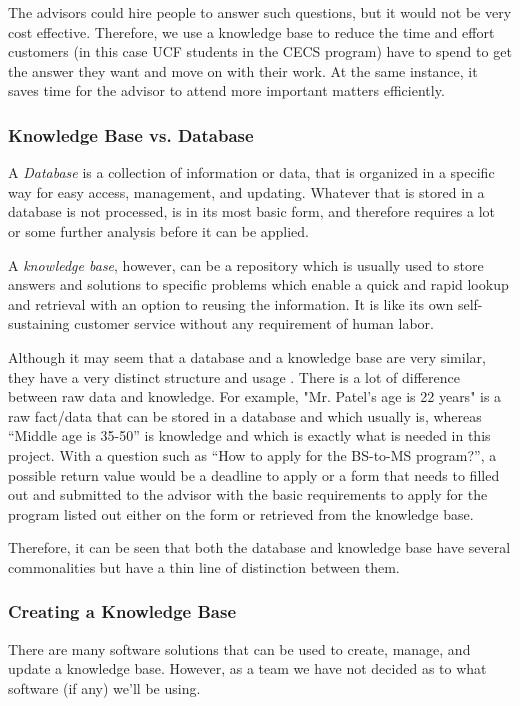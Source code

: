 \documentclass[titlepage, 12pt]{article}
\begin{document}
The advisors could hire people to answer such questions, but it would not be very cost effective. Therefore, we use a knowledge base to reduce the time and effort customers (in this case UCF students in the CECS program) have to spend to get the answer they want and move on with their work. At the same instance, it saves time for the advisor to attend more important matters efficiently.

\subsubsection{Knowledge Base vs. Database}

A \emph{Database} is a collection of information or data, that is organized in a specific way for easy access, management, and updating. Whatever that is stored in a database is not processed, is in its most basic form, and therefore requires a lot or some further analysis before it can be applied.

A \emph{knowledge base}, however, can be a repository which is usually used to store answers and solutions to specific problems which enable a quick and rapid lookup and retrieval with an option to reusing the information. It is like its own self-sustaining customer service without any requirement of human labor.

Although it may seem that a database and a knowledge base are very similar, they have a very distinct structure and usage \cite{bib-2-10}. There is a lot of difference between raw data and knowledge. For example, "Mr. Patel’s age is 22 years" is a raw fact/data that can be stored in a database and which usually is, whereas “Middle age is 35-50” is knowledge and which is exactly what is needed in this project. With a question such as “How to apply for the BS-to-MS program?”, a possible return value would be a deadline to apply or a form that needs to filled out and submitted to the advisor with the basic requirements to apply for the program listed out either on the form or retrieved from the knowledge base.

Therefore, it can be seen that both the database and knowledge base have several commonalities but have a thin line of distinction between them.

\subsubsection{Creating a Knowledge Base}

There are many software solutions that can be used to create, manage, and update a knowledge base. However, as a team we have not decided as to what software (if any) we’ll be using.
\end{document}

